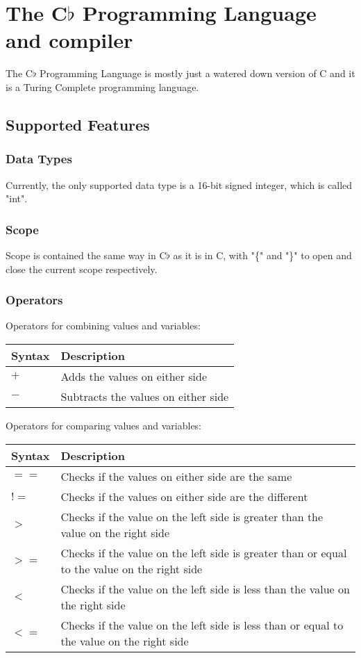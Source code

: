 \section{The C$\flat$ Programming Language and compiler}
	The C$\flat$ Programming Language is mostly just a watered down version of C and it is a Turing Complete programming language.
	\subsection{Supported Features}
		\subsubsection{Data Types}
			Currently, the only supported data type is a 16-bit signed integer, which is called "int".
		\subsubsection{Scope}
			Scope is contained the same way in C$\flat$ as it is in C, with "\{" and "\}" to open and close the current scope respectively.
		\subsubsection{Operators}
			Operators for combining values and variables:
			\begin{center} \begin{tabular}{| l | p{10cm} |} \hline
				Syntax & Description \\ \hline
				$+$    & Adds the values on either side\\ \hline
				$-$    & Subtracts the values on either side\\ \hline
			\end{tabular} \end{center}
			Operators for comparing values and variables:
			\begin{center} \begin{tabular}{| l | p{10cm} |} \hline
				Syntax & Description \\ \hline
				$==$   & Checks if the values on either side are the same\\ \hline
				$!=$   & Checks if the values on either side are the different\\ \hline
				$>$    & Checks if the value on the left side is greater than the value on the right side\\ \hline
				$>=$   & Checks if the value on the left side is greater than or equal to the value on the right side\\ \hline
				$<$    & Checks if the value on the left side is less than the value on the right side\\ \hline
				$<=$   & Checks if the value on the left side is less than or equal to the value on the right side\\ \hline
			\end{tabular} \end{center}
